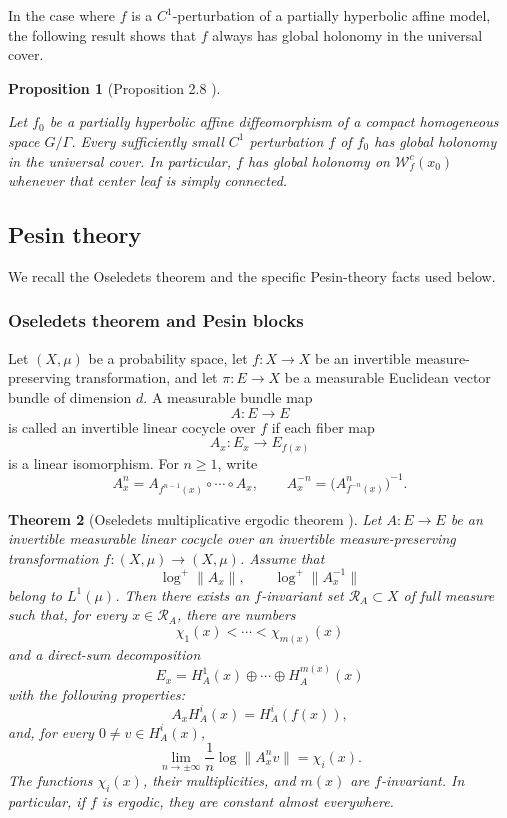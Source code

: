 \documentclass[11pt]{amsart}
\numberwithin{equation}{section}
\theoremstyle{plain}
\newtheorem{thm}{Theorem}[section]
\newtheorem{prop}[thm]{Proposition}
\begin{document}
In the case where $f$ is a $C^1$-perturbation of a partially hyperbolic affine model, the following result shows that $f$ always has global holonomy in the universal cover.

\begin{prop}[Proposition 2.8 \cite{Wang}]\label{proP:globhol}

Let $f_0$ be a partially hyperbolic affine diffeomorphism  of a compact
homogeneous space $G/\Gamma$.   Every sufficiently small $C^1$
 perturbation $f$ of $f_0$ has global holonomy in the universal cover.  In
particular, $f$ has global holonomy  on $\mathcal W_f^c(x_0)$ whenever that
center leaf is simply connected.

\end{prop}



\subsection{Pesin theory}
We  recall the  Oseledets theorem  and the specific Pesin-theory facts used
below.


\subsubsection{Oseledets theorem and Pesin blocks}\mbox{}\par

Let $(X,\mu)$ be a probability space, let
$f:X\to X$ be an invertible measure-preserving transformation, and let
$\pi:E\to X$ be a measurable Euclidean vector bundle of dimension $d$.
A measurable bundle map
\[
A:E\longrightarrow E
\]
is called an invertible linear cocycle over $f$ if each fiber map
\[
A_x:E_x\longrightarrow E_{f(x)}
\]
is a linear isomorphism.  For $n\ge1$, write
\[
A_x^n
 =
A_{f^{n-1}(x)}\circ\cdots\circ A_x,
\qquad
A_x^{-n}
 =
\bigl(A_{f^{-n}(x)}^n\bigr)^{-1}.
\]

\begin{thm}[Oseledets multiplicative ergodic theorem {{\cite[Theorems~3.12 and~4.1]{introdyn}}}]\label{Oseled}
Let $A:E\to E$ be an invertible measurable linear cocycle over an
invertible measure-preserving transformation
$f:(X,\mu)\to(X,\mu)$. Assume that
\[
\log^+\|A_x\|,\qquad \log^+\|A_x^{-1}\|
\]
belong to $L^1(\mu)$. Then there exists an $f$-invariant set
$\mathcal R_A\subset X$ of full measure such that, for every
$x\in\mathcal R_A$, there are numbers
\[
\chi_1(x)<\cdots<\chi_{m(x)}(x)
\]
and a direct-sum decomposition
\[
E_x
 =
H_A^1(x)\oplus\cdots\oplus H_A^{m(x)}(x)
\]
with the following properties:
\[
A_xH_A^i(x)=H_A^i(f(x)),
\]
and, for every $0\ne v\in H_A^i(x)$,
\[
\lim_{n\to\pm\infty}
\frac1n\log\|A_x^nv\|
 =
\chi_i(x).
\]
The functions $\chi_i(x)$, their multiplicities, and $m(x)$ are
$f$-invariant. In particular, if $f$ is ergodic, they are constant
almost everywhere.
\end{thm}
\end{document}
